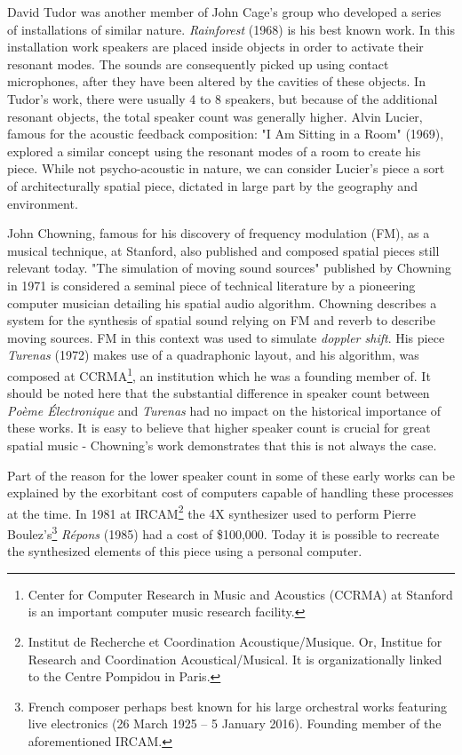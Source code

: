 David Tudor was another member of John Cage's group who developed a series of installations of similar nature. \textit{Rainforest} (1968) is his best known work. In this installation work speakers are placed inside objects in order to activate their resonant modes. The sounds are consequently picked up using contact microphones, after they have been altered by the cavities of these objects. In Tudor's work, there were usually 4 to 8 speakers, but because of the additional resonant objects, the total speaker count was generally higher. Alvin Lucier, famous for the acoustic feedback composition: "I Am Sitting in a Room" (1969), explored a similar concept using the resonant modes of a room to create his piece. While not psycho-acoustic in nature, we can consider Lucier's piece a sort of architecturally spatial piece, dictated in large part by the geography and environment.



John Chowning, famous for his discovery of frequency modulation (FM), as a musical technique, at Stanford, also published and composed spatial pieces still relevant today. "The simulation of moving sound sources" \cite{chowning1971simulation} published by Chowning in 1971 is considered a seminal piece of technical literature by a pioneering computer musician detailing his spatial audio algorithm. Chowning describes a system for the synthesis of spatial sound relying on FM and reverb to describe moving sources. FM in this context was used to simulate \textit{doppler shift}. His piece \textit{Turenas} (1972) makes use of a quadraphonic layout, and his algorithm, was composed at CCRMA\footnote{Center for Computer Research in Music and Acoustics (CCRMA) at Stanford is an important computer music research facility.}, an institution which he was a founding member of. It should be noted here that the substantial difference in speaker count between \textit{Poème Électronique} and \textit{Turenas} had no impact on the historical importance of these works. It is easy to believe that higher speaker count is crucial for great spatial music - Chowning's work demonstrates that this is not always the case.

Part of the reason for the lower speaker count in some of these early works can be explained by the exorbitant cost of computers capable of handling these processes at the time. In 1981 at IRCAM\footnote{Institut de Recherche et Coordination Acoustique/Musique. Or, Institue for Research and Coordination Acoustical/Musical. It is organizationally linked to the Centre Pompidou in Paris.} the 4X synthesizer used to perform Pierre Boulez's\footnote{French composer perhaps best known for his large orchestral works featuring live electronics (26 March 1925 – 5 January 2016). Founding member of the aforementioned IRCAM.} \textit{Répons} (1985) had a cost of \$100,000. Today it is possible to recreate the synthesized elements of this piece using a personal computer. 


